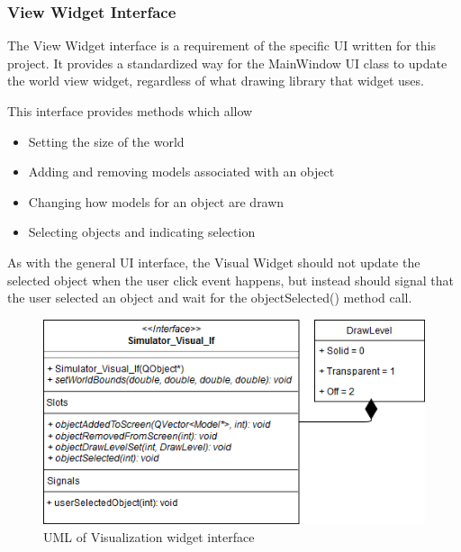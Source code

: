   \subsubsection*{View Widget Interface}
  The View Widget interface is a requirement of the specific UI written for this project. It provides a standardized way for the MainWindow UI class to update the world view widget, regardless of what drawing library that widget uses.
  
  This interface provides methods which allow
  \begin{itemize}
  	\item Setting the size of the world
  	\item Adding and removing models associated with an object
  	\item Changing how models for an object are drawn
  	\item Selecting objects and indicating selection
  \end{itemize}
  
  As with the general UI interface, the Visual Widget should not update the selected object when the user click event happens, but instead should signal that the user selected an object and wait for the objectSelected() method call.
 \begin{figure}[h]
 	\begin{center}
 	\includegraphics[scale=0.5]{./images_design/uml/Visual_If}
 	\caption{UML of Visualization widget interface\label{uml:visual_if}}
 	\end{center}
 \end{figure}
